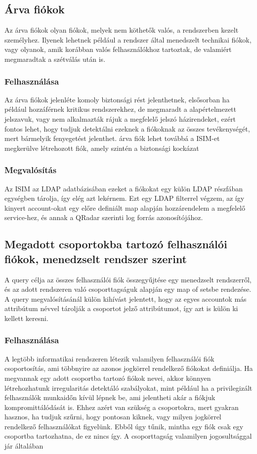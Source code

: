 \subsection{Árva fiókok } \label{lbl:orphanaccs}
Az árva fiókok olyan fiókok, melyek nem köthetők valós, a rendszerben kezelt személyhez. Ilyenek lehetnek például a rendszer által menedszelt technikai fiókok, vagy olyanok, amik korábban valós felhasználókhoz tartoztak, de valamiért megmaradtak a szétválás után is. 
	\subsubsection{Felhasználása}
 	Az árva fiókok jelenléte komoly biztonsági rést jelenthetnek, elsősorban ha például hozzáférnek kritikus rendszerekhez, de megmaradt a alapértelmezett jelszavuk, vagy nem alkalmazták rájuk a megfelelő jelszó házirendeket, ezért fontos lehet, hogy tudjuk detektálni ezeknek a fiókoknak az összes tevékenységét, mert bármelyik fenyegetést jelenthet.
	\laci árva fiók lehet továbbá a ISIM-et megkerülve létrehozott fiók, amely szintén a biztonsági kockázat
	\subsubsection{Megvalósítás}
	Az ISIM az LDAP adatbázisában ezeket a fiókokat egy külön LDAP részfában egységben tárolja, így elég azt lekérnem. Ezt egy LDAP filterrel végzem, az így kinyert account-okat egy előre definiált map alapján hozzárendelem a megfelelő service-hez, és annak a QRadar szerinti log forrás azonosítójához.
	
\subsection{Megadott csoportokba tartozó felhasználói fiókok, menedzselt rendszer szerint}		
A query célja az összes felhasználói fiók összegyűjtése egy menedzselt rendszerről, és az adott rendszeren való csoporttagságuk alapján egy map of setsbe rendezése. A query megvalósításánál külön kihívást jelentett, hogy az egyes accountok más attribútum névvel tárolják a csoportot jelző attribútumot, így azt is külön ki kellett keresni.
	\subsubsection{Felhasználása}
		A legtöbb informatikai rendszeren létezik valamilyen felhasználói fiók csoportosítás, ami többnyire az azonos jogkörrel rendelkező fiókokat definiálja. Ha megvannak egy adott csoportba tartozó fiókok nevei, akkor könnyen létrehozhatunk irregularitás detektáló szabályokat, mint például ha a privilegizált felhasználók munkaidőn kívül lépnek be, ami jelentheti akár a fiókjuk kompromittálódását is. Ehhez azért van szükség a csoportokra, mert gyakran hasznos, ha tudjuk szűrni, hogy pontosan kiknek, vagy milyen jogkörrel rendelkező felhasználókat figyelünk.
		\laci Ebből úgy tűnik, mintha egy fiók csak egy csoportba tartozhatna, de ez nincs így. A csoporttagság valamilyen jogosultsággal jár általában
		 
